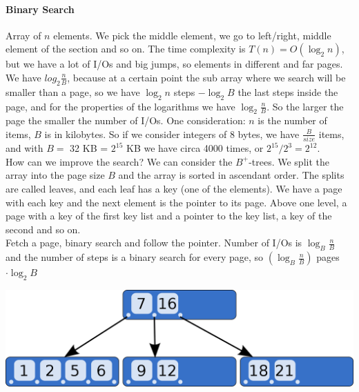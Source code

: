 \documentclass[10pt]{report}
\begin{document}
\paragraph{Binary Search} Array of $n$ elements. We pick the middle element, we go to left/right, middle element of the section and so on. The time complexity is $T(n) = O(\log_2 n)$, but we have a lot of I/Os and big jumps, so elements in different and far pages. We have $log_2 \frac{n}{B}$, because at a certain point the sub array where we search will be smaller than a page, so we have $\log_2 n$ steps $- \log_2 B$ the last steps inside the page, and for the properties of the logarithms we have $\log_2 \frac{n}{B}$. So the larger the page the smaller the number of I/Os. One consideration: $n$ is the number of items, $B$ is in kilobytes. So if we consider integers of 8 bytes, we have $\frac{B}{size}$ items, and with $B =$ 32 KB = $2^{15}$ KB we have circa 4000 times, or $2^{15}/2^3 = 2^{12}$.\\
How can we improve the search? We can consider the $B^+$-trees. We split the array into the page size $B$ and the array is sorted in ascendant order. The splits are called leaves, and each leaf has a key (one of the elements). We have a page with each key and the next element is the pointer to its page. Above one level, a page with a key of the first key list and a pointer to the key list, a key of the second and so on.\\ %
Fetch a page, binary search and follow the pointer. Number of I/Os is $\log_B \frac{n}{B}$ and the number of steps is a binary search for every page, so $(\log_B \frac{n}{B})$ pages $\cdot \log_2 B$
\begin{center}
	\includegraphics[scale=0.25]{2.png}
\end{center}
\end{document}
